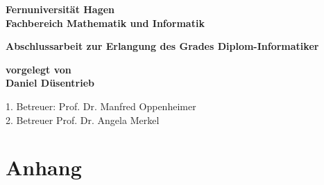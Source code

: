 \documentclass[12pt, parskip=half,liststotoc]{scrbook}
\begin{document}
\begin{titlepage}
{\bfseries\Large Fernuniversität Hagen \\
Fachbereich Mathematik und Informatik}

\vspace*{4cm}
\begin{center}
\bfseries\Large Abschlussarbeit zur Erlangung des Grades Diplom-Informatiker
\end{center}

\vspace*{2cm}
\begin{center}
\bfseries\Large vorgelegt von \\ Daniel Düsentrieb
\end{center}

\vfill
1. Betreuer: Prof. Dr. Manfred Oppenheimer \\
2. Betreuer Prof. Dr. Angela Merkel 
\end{titlepage}

\frontmatter

\tableofcontents

\listoffigures

\listoftables

\mainmatter







\backmatter

\chapter{Anhang}

\blindtext[10]
\end{document}
